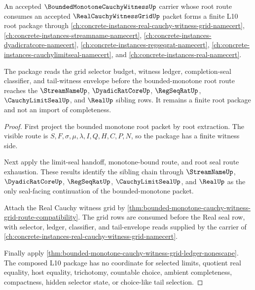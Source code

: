 \begin{theorem}
\label{thm:bounded-monotone-cauchy-witness-grid-root-package}
An accepted $\BoundedMonotoneCauchyWitnessUp$ carrier whose root route consumes an accepted $\RealCauchyWitnessGridUp$ packet forms a finite L10 root package through \autoref{ch:concrete-instances-real-cauchy-witness-grid-namecert}, \autoref{ch:concrete-instances-streamname-namecert}, \autoref{ch:concrete-instances-dyadicratcore-namecert}, \autoref{ch:concrete-instances-regseqrat-namecert}, \autoref{ch:concrete-instances-cauchylimitseal-namecert}, and \autoref{ch:concrete-instances-real-namecert}.

The package reads the grid selector budget, witness ledger, completion-seal classifier, and tail-witness envelope before the bounded-monotone root route reaches the $\StreamNameUp$, $\DyadicRatCoreUp$, $\RegSeqRatUp$, $\CauchyLimitSealUp$, and $\RealUp$ sibling rows. It remains a finite root package and not an import of completeness.
\end{theorem}
\begin{proof}
First project the bounded monotone root packet by root extraction. The visible route is $S,F,\sigma,\mu,\lambda,I,Q,H,C,P,N$, so the package has a finite witness side.

Next apply the limit-seal handoff, monotone-bound route, and root seal route exhaustion. These results identify the sibling chain through $\StreamNameUp$, $\DyadicRatCoreUp$, $\RegSeqRatUp$, $\CauchyLimitSealUp$, and $\RealUp$ as the only seal-facing continuation of the bounded-monotone packet.

Attach the Real Cauchy witness grid by \autoref{thm:bounded-monotone-cauchy-witness-grid-route-compatibility}. The grid rows are consumed before the Real seal row, with selector, ledger, classifier, and tail-envelope reads supplied by the carrier of \autoref{ch:concrete-instances-real-cauchy-witness-grid-namecert}.

Finally apply \autoref{thm:bounded-monotone-cauchy-witness-grid-ledger-nonescape}. The composed L10 package has no coordinate for selected limits, quotient real equality, host equality, trichotomy, countable choice, ambient completeness, compactness, hidden selector state, or choice-like tail selection.
\end{proof}

